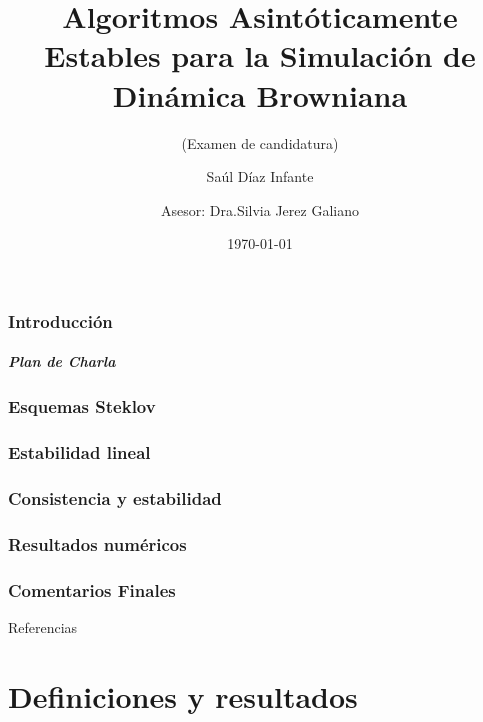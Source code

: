 \documentclass[spanish,10pt,xcolor=dvipsnames,table]{beamer}
\title{Algoritmos Asintóticamente Estables para la Simulación de Dinámica
  Browniana }
\subtitle{(Examen de candidatura)}
\author[]{Sa\'ul D\'iaz Infante \and Asesor: Dra.Silvia Jerez Galiano}
\institute{CIMAT A.C.}
\date\today
\theoremstyle{plain} %
\theoremstyle{definition}
\begin{document}
  \frame{\titlepage \vspace{-0.5cm}}
 \section*{Introducci\'on}
 	
 	\begin{frame}
	\frametitle{Plan de Charla}
    \tableofcontents[pausesections]
\end{frame}
  \section{Esquemas Steklov}
   
  \section{Estabilidad lineal}
    
	
  \section{Consistencia y estabilidad}
	
	
	\section{Resultados numéricos}
  	
  \section{Comentarios Finales}
  	
\begin{frame}[allowframebreaks]{Referencias}
	
	
\end{frame}
\appendix
	\part{Definiciones y resultados}
	
\end{document}
